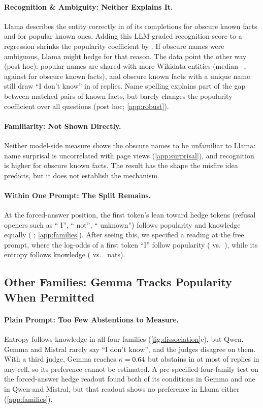 \documentclass{article}
\newcommand{\idk}{``I don't know''}
\begin{document}
\paragraph{Recognition \& Ambiguity: Neither Explains It.} Llama describes the entity correctly in \ekObsKnown{} of its completions for obscure known facts and \ekPopKnown{} for popular known ones. Adding this LLM-graded recognition score to a regression shrinks the popularity coefficient by \ekShrink. If obscure names were ambiguous, Llama might hedge for that reason. The data point the other way (post hoc): popular names are shared with more Wikidata entities (median \amPopKnownHom--\amPopUnkHom, against \amObsKnownHom{} for obscure known facts), and obscure known facts with a unique name still draw \idk{} in \amSingle{} of replies. Name spelling explains part of the gap between matched pairs of known facts, but barely changes the popularity coefficient over all questions (post hoc; \cref{app:robust}).

\paragraph{Familiarity: Not Shown Directly.} Neither model-side measure shows the obscure names to be unfamiliar to Llama: name surprisal is uncorrelated with page views (\cref{app:surprisal}), and recognition is higher for obscure known facts. The result has the shape the misfire idea predicts, but it does not establish the mechanism.

\paragraph{Within One Prompt: The Split Remains.} At the forced-answer position, the first token's lean toward hedge tokens (refusal openers such as `` I'', `` not'', `` unknown'') follows popularity and knowledge equally (\loLlamaDiff{} \loLlamaDiffCI; \cref{app:families}). After seeing this, we specified a reading at the free prompt, where the log-odds of a first token ``I'' follow popularity (\eoFreeIPop{} vs.\ \eoFreeIKnow), while its entropy follows knowledge (\eoFreeEntKnow{} vs.\ \eoFreeEntPop{} nats).

\subsection{Other Families: Gemma Tracks Popularity When Permitted}
\label{sec:families}

\paragraph{Plain Prompt: Too Few Abstentions to Measure.} Entropy follows knowledge in all four families (\cref{fig:dissociation}c), but Qwen, Gemma and Mistral rarely say \idk, and the judges disagree on them. With a third judge, Gemma reaches $\kappa=0.64$ but abstains in at most \tjGemmaObsUnk{} of replies in any cell, so its preference cannot be estimated. A pre-specified four-family test on the forced-answer hedge readout found both of its conditions in Gemma and one in Qwen and Mistral, but that readout shows no preference in Llama either (\cref{app:families}).
\end{document}
